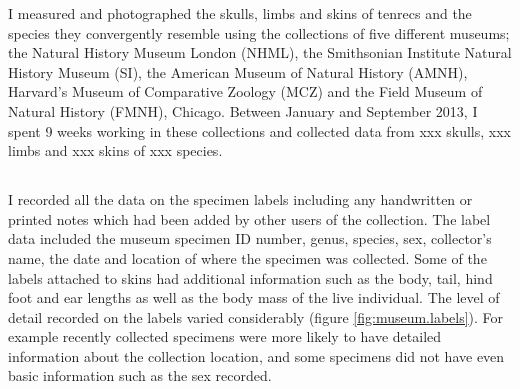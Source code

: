 I measured and photographed the skulls, limbs and skins of tenrecs and the species they convergently resemble using the collections of five different museums; the Natural History Museum London (NHML), the Smithsonian Institute Natural History Museum (SI), the American Museum of Natural History (AMNH), Harvard’s Museum of Comparative Zoology (MCZ) and the Field Museum of Natural History (FMNH), Chicago. Between January and September 2013, I spent 9 weeks working in these collections and collected data from xxx skulls, xxx limbs and xxx skins of xxx species. 

\subsection{}
I recorded all the data on the specimen labels including any handwritten or printed notes which had been added by other users of the collection. The label data included the museum specimen ID number, genus, species, sex, collector’s name, the date and location of where the specimen was collected. Some of the labels attached to skins had additional information such as the body, tail, hind foot and ear lengths as well as the body mass of the live individual. 
The level of detail recorded on the labels varied considerably (figure \ref{fig:museum.labels}). For example recently collected specimens were more likely to have detailed information about the collection location, and some specimens did not have even basic information such as the sex recorded. 


